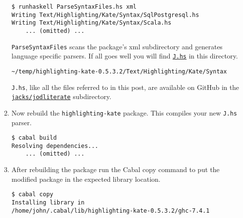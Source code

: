 \begin{enumerate}
\begin{tcolorbox}[breakable, size=fbox, boxrule=1pt, pad at break*=1mm,colback=cellbackground, colframe=cellborder]
\begin{verbatim}
$ runhaskell ParseSyntaxFiles.hs xml
Writing Text/Highlighting/Kate/Syntax/SqlPostgresql.hs
Writing Text/Highlighting/Kate/Syntax/Scala.hs
    ... (omitted) ...
\end{verbatim}
\end{tcolorbox}

  \texttt{ParseSyntaxFiles} scans the package's xml subdirectory and
  generates language specific parsers. If all goes well you will find
  \href{https://github.com/bakerjd99/jacks/blob/master/jodliterate/J.hs}{\texttt{J.hs}} in this directory.

\begin{tcolorbox}[breakable, size=fbox, boxrule=1pt, pad at break*=1mm,colback=cellbackground, colframe=cellborder]
\begin{verbatim}
~/temp/highlighting-kate-0.5.3.2/Text/Highlighting/Kate/Syntax
\end{verbatim}
\end{tcolorbox}

  \texttt{J.hs}, like all the files referred to in this post, are
  available on GitHub in the \href{https://github.com/bakerjd99/jacks/tree/master/jodliterate}{\texttt{jacks/jodliterate}}
  subdirectory.
\item
  Now rebuild the \texttt{highlighting-kate} package. This compiles your
  new \texttt{J.hs} parser.

\begin{tcolorbox}[breakable, size=fbox, boxrule=1pt, pad at break*=1mm,colback=cellbackground, colframe=cellborder]
\begin{verbatim}
$ cabal build
Resolving dependencies...
    ... (omitted) ...
\end{verbatim}
\end{tcolorbox}
\item
  After rebuilding the package run the Cabal copy command to put the
  modified package in the expected library location.

\begin{tcolorbox}[breakable, size=fbox, boxrule=1pt, pad at break*=1mm,colback=cellbackground, colframe=cellborder]
\begin{verbatim}
$ cabal copy
Installing library in
/home/john/.cabal/lib/highlighting-kate-0.5.3.2/ghc-7.4.1
\end{verbatim}
\end{tcolorbox}
\end{enumerate}

